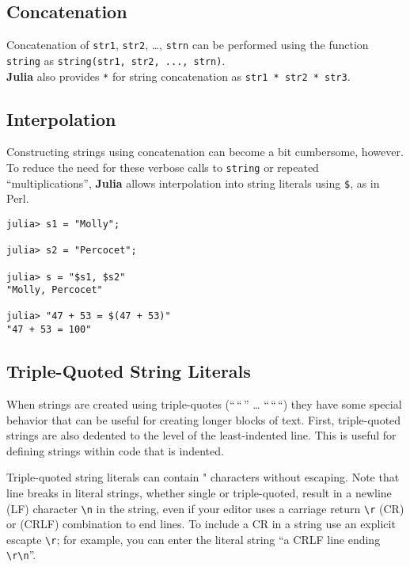 \documentclass[
]{article}
\begin{document}
\hypertarget{concatenation}{%
\subsection{Concatenation}\label{concatenation}}

Concatenation of \texttt{str1}, \texttt{str2}, \ldots, \texttt{strn} can
be performed using the function \texttt{string} as
\texttt{string(str1,\ str2,\ ...,\ strn)}.\\
\textbf{Julia} also provides \texttt{*} for string concatenation as
\texttt{str1\ *\ str2\ *\ str3}.

\hypertarget{interpolation}{%
\subsection{Interpolation}\label{interpolation}}

Constructing strings using concatenation can become a bit cumbersome,
however. To reduce the need for these verbose calls to \texttt{string}
or repeated ``multiplications'', \textbf{Julia} allows interpolation
into string literals using \texttt{\$}, as in Perl.

\begin{verbatim}
julia> s1 = "Molly";

julia> s2 = "Percocet";

julia> s = "$s1, $s2"
"Molly, Percocet"

julia> "47 + 53 = $(47 + 53)"
"47 + 53 = 100"
\end{verbatim}

\hypertarget{triple-quoted-string-literals}{%
\subsection{Triple-Quoted String
Literals}\label{triple-quoted-string-literals}}

When strings are created using triple-quotes (``\,``\,'' \ldots{}
``\,``\,``) they have some special behavior that can be useful for
creating longer blocks of text. First, triple-quoted strings are also
dedented to the level of the least-indented line. This is useful for
defining strings within code that is indented.

Triple-quoted string literals can contain " characters without escaping.
Note that line breaks in literal strings, whether single or
triple-quoted, result in a newline (LF) character
\texttt{\textbackslash{}n} in the string, even if your editor uses a
carriage return \texttt{\textbackslash{}r} (CR) or (CRLF) combination to
end lines. To include a CR in a string use an explicit escapte
\texttt{\textbackslash{}r}; for example, you can enter the literal
string ``a CRLF line ending
\texttt{\textbackslash{}r\textbackslash{}n}''.
\end{document}
